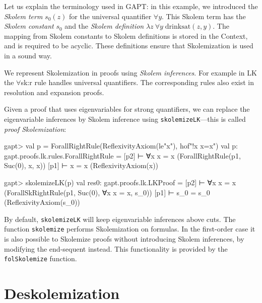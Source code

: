 \documentclass[a4paper,11pt]{book}
\begin{document}
Let us explain the terminology used in GAPT: in this example, we introduced
the \emph{Skolem term} $s_0(z)$ for the universal quantifier $\forall y$.  This
Skolem term has the \emph{Skolem constant} $s_0$ and the \emph{Skolem
  definition} $\lambda z\: \forall y\; \mathrm{drinksat}(z,y)$.  The mapping from
Skolem constants to Skolem definitions is stored in the Context, and is
required to be acyclic.  These definitions ensure that Skolemization is used in
a sound way.

We represent Skolemization in proofs using \emph{Skolem inferences}.  For
example in LK the $\forall$sk:r rule handles universal quantifiers.  The
corresponding rules also exist in resolution and expansion proofs.
\begin{prooftree}
\end{prooftree}

Given a proof that uses eigenvariables for strong quantifiers, we can replace
the eigenvariable inferences by Skolem inference using
\texttt{skolemizeLK}---this is called \emph{proof Skolemization}:
\begin{clilisting}
  gapt> val p = ForallRightRule(ReflexivityAxiom(le"x"), hof"!x x=x")
  val p: gapt.proofs.lk.rules.ForallRightRule = [p2]  ⊢ ∀x x = x    (ForallRightRule(p1, Suc(0), x, x))
  [p1]  ⊢ x = x    (ReflexivityAxiom(x))

  gapt> skolemizeLK(p)
  val res0: gapt.proofs.lk.LKProof = [p2]  ⊢ ∀x x = x    (ForallSkRightRule(p1, Suc(0), ∀x x = x, s_0))
  [p1]  ⊢ s_0 = s_0    (ReflexivityAxiom(s_0))

\end{clilisting}

By default, \texttt{skolemizeLK} will keep eigenvariable inferences above cuts.
The function \texttt{skolemize} performs Skolemization on formulas.
In the first-order case it is also possible to Skolemize proofs without
introducing Skolem inferences, by modifying the end-sequent instead.  This
functionality is provided by the \texttt{folSkolemize} function.

\section{Deskolemization}
\end{document}
